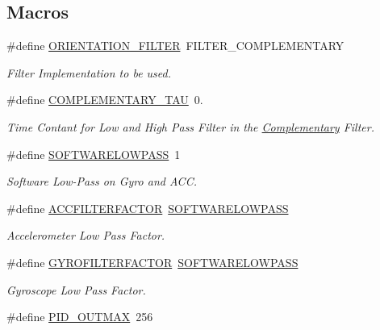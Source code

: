 \subsection*{Macros}
\begin{DoxyCompactItemize}
\item 
\#define \hyperlink{group__config_gaf45c761b3bd949068c77712e21259564}{O\-R\-I\-E\-N\-T\-A\-T\-I\-O\-N\-\_\-\-F\-I\-L\-T\-E\-R}~F\-I\-L\-T\-E\-R\-\_\-\-C\-O\-M\-P\-L\-E\-M\-E\-N\-T\-A\-R\-Y
\begin{DoxyCompactList}\small\item\em Filter Implementation to be used. \end{DoxyCompactList}\item 
\#define \hyperlink{group__config_ga61cd22949cc88bd899de6b20cb61e959}{C\-O\-M\-P\-L\-E\-M\-E\-N\-T\-A\-R\-Y\-\_\-\-T\-A\-U}~0.
\begin{DoxyCompactList}\small\item\em Time Contant for Low and High Pass Filter in the \hyperlink{struct_complementary}{Complementary} Filter. \end{DoxyCompactList}\item 
\#define \hyperlink{group__config_gaba06e7be57726e74f267a1622e7d720e}{S\-O\-F\-T\-W\-A\-R\-E\-L\-O\-W\-P\-A\-S\-S}~1
\begin{DoxyCompactList}\small\item\em Software Low-\/\-Pass on Gyro and A\-C\-C. \end{DoxyCompactList}\item 
\#define \hyperlink{group__config_gaace41596724b03f3f2b2ee28b7e87272}{A\-C\-C\-F\-I\-L\-T\-E\-R\-F\-A\-C\-T\-O\-R}~\hyperlink{group__config_gaba06e7be57726e74f267a1622e7d720e}{S\-O\-F\-T\-W\-A\-R\-E\-L\-O\-W\-P\-A\-S\-S}
\begin{DoxyCompactList}\small\item\em Accelerometer Low Pass Factor. \end{DoxyCompactList}\item 
\#define \hyperlink{group__config_ga1b5d47810976ecbfd688513246db3ba9}{G\-Y\-R\-O\-F\-I\-L\-T\-E\-R\-F\-A\-C\-T\-O\-R}~\hyperlink{group__config_gaba06e7be57726e74f267a1622e7d720e}{S\-O\-F\-T\-W\-A\-R\-E\-L\-O\-W\-P\-A\-S\-S}
\begin{DoxyCompactList}\small\item\em Gyroscope Low Pass Factor. \end{DoxyCompactList}\item 
\#define \hyperlink{group__config_gaf36e4eab421932a006c7df7e84f11cf0}{P\-I\-D\-\_\-\-O\-U\-T\-M\-A\-X}~256

\end{DoxyCompactItemize}
